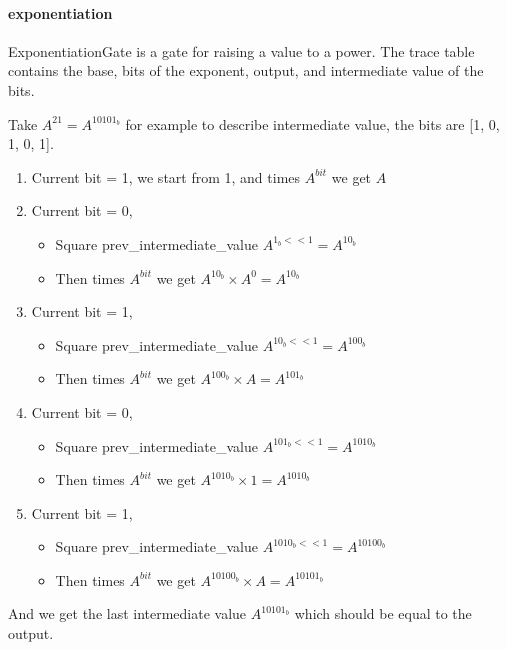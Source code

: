 \paragraph{exponentiation}

ExponentiationGate is a gate for raising a value to a power. The trace table contains the base, bits of the exponent, output, and intermediate value of the bits.

Take $A^{21} = A^{10101_b}$ for example to describe intermediate value, the bits are [1, 0, 1, 0, 1].

\begin{enumerate}
    \item Current bit = 1, we start from 1, and times $A^{bit}$ we get $A$
    \item Current bit = 0,
    \begin{itemize}
        \item Square prev\_intermediate\_value $A^{1_b << 1} = A^{10_b}$
        \item Then times $A^{bit}$ we get $A^{10_b} \times A^0 = A^{10_b}$
    \end{itemize}
    \item Current bit = 1,
    \begin{itemize}
        \item Square prev\_intermediate\_value $A^{10_b << 1} = A^{100_b}$
        \item Then times $A^{bit}$ we get $A^{100_b} \times A = A^{101_b}$
    \end{itemize}
    \item Current bit = 0,
    \begin{itemize}
        \item Square prev\_intermediate\_value $A^{101_b << 1} = A^{1010_b}$
        \item Then times $A^{bit}$ we get $A^{1010_b} \times 1 = A^{1010_b}$
    \end{itemize}
    \item Current bit = 1,
    \begin{itemize}
        \item Square prev\_intermediate\_value $A^{1010_b << 1} = A^{10100_b}$
        \item Then times $A^{bit}$ we get $A^{10100_b} \times A = A^{10101_b}$
    \end{itemize}
\end{enumerate}

And we get the last intermediate value $A^{10101_b}$ which should be equal to the output.

